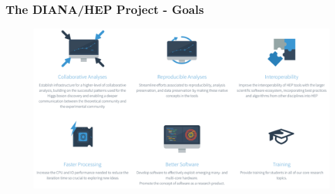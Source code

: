 \begin{frame}
\frametitle{The DIANA/HEP Project - Goals}

\begin{figure}[htbp]
\begin{center}
\includegraphics[width=1.0\textwidth]{images/20160610-diana-goals.png}
\end{center}
\end{figure}

\end{frame}


